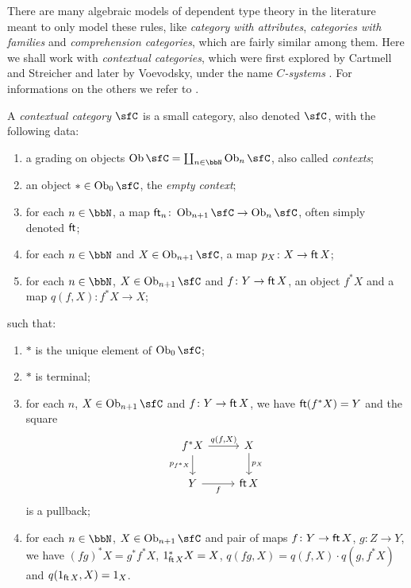 There are many algebraic models of dependent type theory in the literature meant
to only model these rules, like
\emph{category with attributes}, \emph{categories with families} and
\emph{comprehension categories}, which are
fairly similar among them.
Here we shall work with \emph{contextual
categories}, which were first explored by Cartmell and Streicher
\cite{Car78,Car86,Str91} and later by Voevodsky, under the name
$C$\emph{-systems} \cite{Voe14a}. For informations on the
others we refer to \cite{nlab:categorical_model_of_dependent_types}.

\begin{defn}
  A \emph{contextual category} $\sfC$ is a small category, also denoted $\sfC$,
  with the following data:
  \begin{enumerate}
    \item a grading on objects $\Ob\sfC=\coprod_{n\in\bbN}\Ob_n\sfC$, also
      called \emph{contexts};
    \item an object $*\in\Ob_0\sfC$, the \emph{empty context};
    \item for each $n\in\bbN$, a map
      $\cft_n\colon\Ob_{n+1}\sfC\rightarrow\Ob_n\sfC$, often simply denoted
      $\operatorname{\mathsf{ft}}$;
    \item for each $n\in\bbN$ and $X\in\Ob_{n+1}\sfC$, a map $p_X\colon
      X\rightarrow\operatorname{\mathsf{ft}} X$;
    \item for each $n\in\bbN$, $X\in\Ob_{n+1}\sfC$ and $f\colon Y\rightarrow
      \operatorname{\mathsf{ft}} X$, an object $f^*X$ and a map $q(f,X)\colon f^*X\rightarrow X$;
  \end{enumerate}
  such that:
  \begin{enumerate}
    \item $*$ is the unique element of $\Ob_0\sfC$;
    \item $*$ is terminal;
    \item for each $n$, $X\in\Ob_{n+1}\sfC$ and $f\colon Y\rightarrow \operatorname{\mathsf{ft}} X$, we
      have $\operatorname{\mathsf{ft}}(f^*X)=Y$ and the square
      \[\begin{tikzcd}
        {f^*X} & X \\
        Y & \cft X
        \arrow["f"', from=2-1, to=2-2]
        \arrow["{p_X}", from=1-2, to=2-2]
        \arrow["{q(f,X)}", from=1-1, to=1-2]
        \arrow["{p_{f^*X}}"', from=1-1, to=2-1]
      \end{tikzcd}\]
      is a pullback;
    \item for each $n\in\bbN$, $X\in\Ob_{n+1}\sfC$ and pair of maps $f\colon
      Y\rightarrow \operatorname{\mathsf{ft}} X$, $g\colon Z\rightarrow Y$, we have $(fg)^*X=g^*f^*X$,
      $1^*_{\operatorname{\mathsf{ft}} X}X=X$, $q(fg,X)=q(f,X)\cdot q(g,f^*X)$ and $q(1_{\operatorname{\mathsf{ft}} X},X)=1_X$.
  \end{enumerate}
\end{defn}

